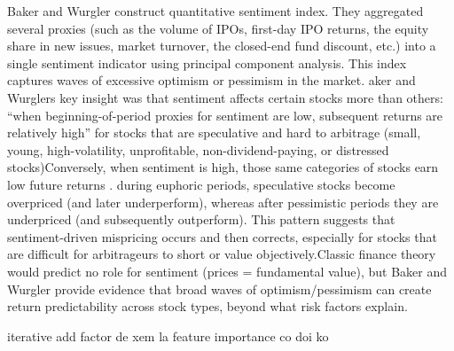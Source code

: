 Baker and Wurgler construct quantitative sentiment index. They aggregated several proxies (such as the volume of IPOs, first-day IPO returns, the equity share in new issues, market turnover, the closed-end fund discount, etc.) into a single sentiment indicator using principal component analysis. This index captures waves of excessive optimism or pessimism in the market. aker and Wurglers key insight was that sentiment affects certain stocks more than others: “when beginning-of-period proxies for sentiment are low, subsequent returns are relatively high” for stocks that are speculative and hard to arbitrage (small, young, high-volatility, unprofitable, non-dividend-paying, or distressed stocks)Conversely, when sentiment is high, those same categories of stocks earn low future returns . during euphoric periods, speculative stocks become overpriced (and later underperform), whereas after pessimistic periods they are underpriced (and subsequently outperform). This pattern suggests that sentiment-driven mispricing occurs and then corrects, especially for stocks that are difficult for arbitrageurs to short or value objectively.Classic finance theory would predict no role for sentiment (prices = fundamental value), but Baker and Wurgler provide evidence that broad waves of optimism/pessimism can create return predictability across stock types, beyond what risk factors explain.





iterative add factor de xem la feature importance co doi ko 